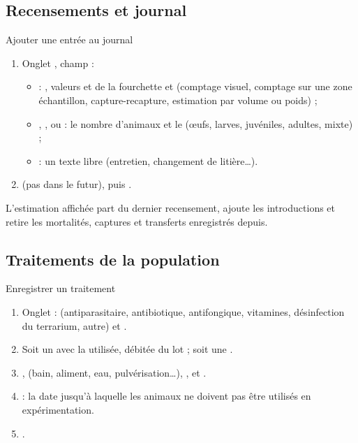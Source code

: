\documentclass[11pt,a4paper]{article}
\begin{document}
\subsection{Recensements et journal}
\begin{procedure}{Ajouter une entrée au journal}
\begin{enumerate}
  \item Onglet , champ  :
    \begin{itemize}
      \item {} : , valeurs  et
         de la fourchette et  (comptage visuel,
        comptage sur une zone échantillon, capture-recapture, estimation par
        volume ou poids) ;
      \item {}, ,  ou
         : le nombre d'animaux et le 
        (œufs, larves, juvéniles, adultes, mixte) ;
      \item {} : un texte libre (entretien, changement de litière…).
    \end{itemize}
  \item {} (pas dans le futur), puis .
\end{enumerate}
\end{procedure}
L'estimation affichée part du dernier recensement, ajoute les introductions
et retire les mortalités, captures et transferts enregistrés depuis.

\subsection{Traitements de la population}
\begin{procedure}{Enregistrer un traitement}
\begin{enumerate}
  \item Onglet  :  (antiparasitaire,
    antibiotique, antifongique, vitamines, désinfection du terrarium, autre)
    et .
  \item Soit un  avec la 
    utilisée, débitée du lot ; soit une .
  \item {},  (bain, aliment, eau, pulvérisation…),
    ,  et .
  \item {} : la date jusqu'à laquelle les
    animaux ne doivent pas être utilisés en expérimentation.
  \item {}.
\end{enumerate}
\end{procedure}
\end{document}
